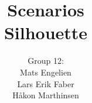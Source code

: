 \documentclass[12pt]{article}
\begin{document}
\title{%
    Scenarios\\
    \large Silhouette}
\author{%
    Group 12:\\
    Mats Engelien\\
    Lars Erik Faber\\
    Håkon Marthinsen}
\date{}
\maketitle

\thispagestyle{empty}

\newpage

\setcounter{page}{1}
\end{document}
